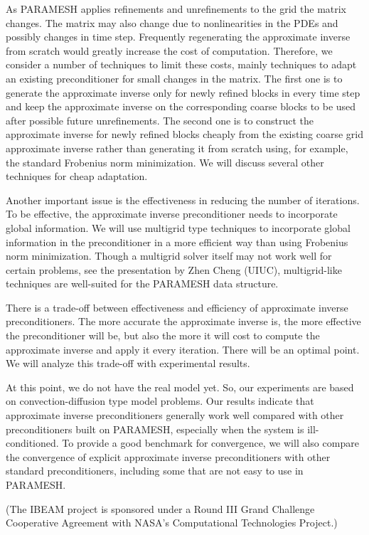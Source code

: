 \documentclass{report}
\begin{document}
As PARAMESH applies refinements and unrefinements to the grid the
matrix changes. The matrix may also change due to nonlinearities in
the PDEs and possibly changes in time step. Frequently regenerating the
approximate inverse from scratch would greatly increase the cost of
computation. Therefore, we consider a number of techniques to limit these costs,
mainly techniques to adapt an existing preconditioner for small changes in the
matrix. The first one is to generate the approximate
inverse only for newly refined blocks in every time step and keep
the approximate inverse on the corresponding coarse blocks to be used after
possible future unrefinements. The second one is to construct the approximate
inverse for newly refined blocks cheaply from the existing coarse grid
approximate inverse rather than generating it from scratch using, for example, the
standard Frobenius norm minimization. We will discuss several other techniques
for cheap adaptation.

Another important issue is the effectiveness in reducing the number of iterations.
To be effective, the approximate inverse preconditioner needs to incorporate global
information. We will use multigrid type techniques to incorporate global information
in the preconditioner in a more efficient way than using Frobenius norm minimization.
Though a multigrid solver itself may not work well for
certain problems, see the presentation by Zhen Cheng (UIUC), multigrid-like
techniques are well-suited for the PARAMESH data structure.

There is a trade-off between effectiveness and efficiency of
approximate inverse preconditioners. The more accurate the
approximate inverse is, the more effective the preconditioner will
be, but also the more it will cost to compute the approximate
inverse and apply it every iteration. There will be an optimal
point. We will analyze this trade-off with experimental
results.

At this point, we do not have the real model yet. So, our
experiments are based on convection-diffusion type model problems.
Our results indicate that approximate inverse preconditioners
generally work well compared with other preconditioners built on
PARAMESH, especially when the system is ill-conditioned. To
provide a good benchmark for convergence, we will also compare the
convergence of explicit approximate inverse preconditioners with
other standard
preconditioners, including some that are not easy to use in PARAMESH.

(The IBEAM project is sponsored under a Round III Grand Challenge
Cooperative Agreement with NASA's Computational Technologies
Project.)
\end{document}
